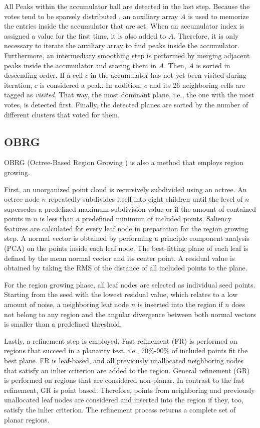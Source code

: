 \documentclass[main.tex]{subfiles}
\begin{document}
All Peaks within the accumulator ball are detected in the last step. Because the votes tend to be sparsely distributed \cite[Section~3.4]{Limberger_Oliveira_2015},
an auxiliary array $A$ is used to memorize the entries inside the accumulator that are set. When an accumulator index is assigned a value for the first time, it is also added to $A$. 
Therefore, it is only necessary to iterate the auxiliary array to find peaks inside the accumulator.
Furthermore, an intermediary smoothing step is performed by merging adjacent peaks inside the accumulator and storing them in $A$.
Then, $A$ is sorted in descending order.
If a cell $c$ in the accumulator has not yet been visited during iteration, $c$ is considered a peak. In addition, $c$ and its 26 neighboring cells are tagged as \textit{visited}. 
That way, the most dominant plane, i.e., the one with the most votes, is detected first.
Finally, the detected planes are sorted by the number of different clusters that voted for them. 

\subsection{OBRG} \label{sec:bg-obrg}
OBRG (Octree-Based Region Growing \cite{Vo_Truong-Hong_Laefer_Bertolotto_2015}) is also a method that employs region growing.

First, an unorganized point cloud is recursively subdivided using an octree.
An octree node $n$ repeatedly subdivides itself into eight children until the level of $n$ supersedes a predefined maximum subdivision value or if the
amount of contained points in $n$ is less than a predefined minimum of included points.
Saliency features are calculated for every leaf node in preparation for the region growing step. A normal vector is obtained by performing a principle
component analysis (PCA) on the points inside each leaf node. The best-fitting plane of each leaf is defined by the mean normal vector and its center point.
A residual value is obtained by taking the RMS of the distance of all included points to the plane.

For the region growing phase, all leaf nodes are selected as individual seed points. Starting from the seed with the lowest residual value, which relates to a low amount of noise,
a neighboring leaf node $n$ is inserted into the region if $n$ does not belong to any region and the angular divergence between both normal vectors is smaller than
a predefined threshold.

Lastly, a refinement step is employed.
Fast refinement (FR) is performed on regions that succeed in a planarity test, i.e., 70\%-90\% of included points fit the best plane. FR is leaf-based, and all previously unallocated neighboring nodes that satisfy an inlier criterion are added to the region.
General refinement (GR) is performed on regions that are considered non-planar. In contrast to the fast refinement, GR is point based. Therefore,
points from neighboring and previously unallocated leaf nodes are considered and inserted into the region if they, too, satisfy the inlier criterion.
The refinement process returns a complete set of planar regions.
\end{document}
